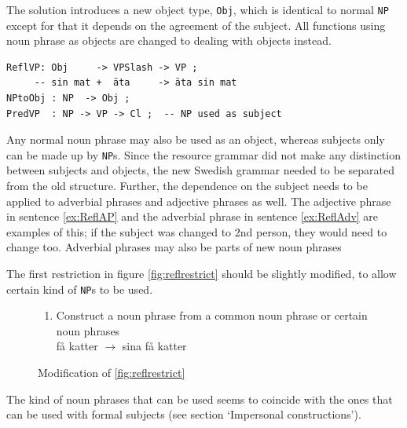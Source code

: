 \documentclass{report}
\begin{document}
The solution introduces a new object type, \verb_Obj_, which is
identical to normal \verb_NP_ except for that it depends on the agreement of
the subject. All functions using noun phrase as objects are changed to dealing
with objects instead.
\begin{verbatim}
ReflVP: Obj     -> VPSlash -> VP ;
     -- sin mat +  äta     -> äta sin mat 
NPtoObj : NP  -> Obj ;
PredVP  : NP -> VP -> Cl ;  -- NP used as subject
\end{verbatim}
Any normal noun phrase may also be used as an object, whereas subjects only
can be made up by \verb-NP-s.
Since the resource grammar did not make any distinction between
subjects and objects, the new Swedish grammar needed to be separated from the old
structure. 
Further, the dependence on the subject needs to be applied to adverbial phrases and
adjective phrases as well. The adjective phrase in sentence \ref{ex:ReflAP} and
the adverbial phrase in sentence \ref{ex:ReflAdv} are examples of this; if the
subject was changed to 2nd person, they  would need to change too.
 \label{ex:ReflAP2}
\vspace{-2mm}
 \label{ex:ReflAdv2}
Adverbial phrases may also be parts of new noun phrases

The first restriction in figure \ref{fig:reflrestrict} should be slightly
modified, to allow certain kind of \verb|NP|s to be used.
\begin{figure}[h]
\begin{enumerate}
\item{
Construct a noun phrase from a common noun phrase or certain noun phrases \\
få katter $\rightarrow$ sina få katter} 
\end{enumerate}
\caption{Modification of \ref{fig:reflrestrict}}
\end{figure}

The kind of noun phrases that can be used seems to coincide with the ones
that can be used with formal subjects (see section `Impersonal constructions').
\end{document}
